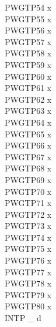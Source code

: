 \documentclass[12pt]{article}
\begin{document}
PWGTP54 x\\
PWGTP55 x\\
PWGTP56 x\\
PWGTP57 x\\
PWGTP58 x\\
PWGTP59 x\\
PWGTP60 x\\
PWGTP61 x\\
PWGTP62 x\\
PWGTP63 x\\
PWGTP64 x\\
PWGTP65 x\\
PWGTP66 x\\
PWGTP67 x\\
PWGTP68 x\\
PWGTP69 x\\
PWGTP70 x\\
PWGTP71 x\\
PWGTP72 x\\
PWGTP73 x\\
PWGTP74 x\\
PWGTP75 x\\
PWGTP76 x\\
PWGTP77 x\\
PWGTP78 x\\
PWGTP79 x\\
PWGTP80 x\\
INTP \_  d\\
\end{document}
